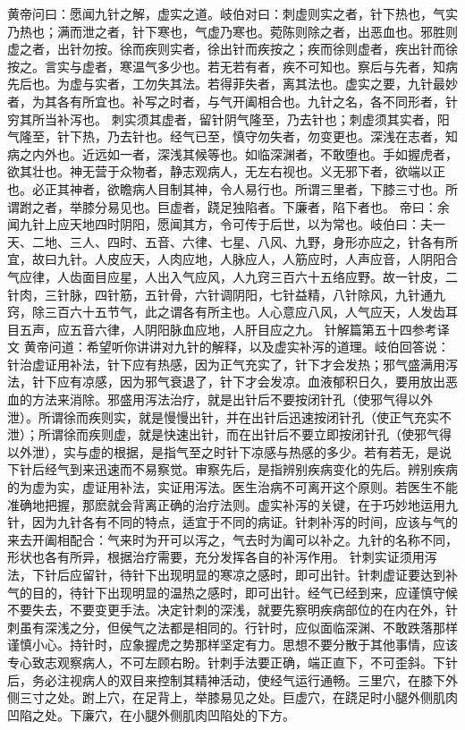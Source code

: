\documentclass[a4paper,12pt,UTF8,twoside]{ctexbook}
\begin{document}
黄帝问曰：愿闻九针之解，虚实之道。岐伯对曰：刺虚则实之者，针下热也，气实乃热也；满而泄之者，针下寒也，气虚乃寒也。菀陈则除之者，出恶血也。邪胜则虚之者，出针勿按。徐而疾则实者，徐出针而疾按之；疾而徐则虚者，疾出针而徐按之。言实与虚者，寒温气多少也。若无若有者，疾不可知也。察后与先者，知病先后也。为虚与实者，工勿失其法。若得菲失者，离其法也。虚实之要，九针最妙者，为其各有所宜也。补写之时者，与气开阖相合也。九针之名，各不同形者，针穷其所当补泻也。
刺实须其虚者，留针阴气隆至，乃去针也；刺虚须其实者，阳气隆至，针下热，乃去针也。经气已至，慎守勿失者，勿变更也。深浅在志者，知病之内外也。近远如一者，深浅其候等也。如临深渊者，不敢堕也。手如握虎者，欲其壮也。神无营于众物者，静志观病人，无左右视也。义无邪下者，欲端以正也。必正其神者，欲瞻病人目制其神，令人易行也。所谓三里者，下膝三寸也。所谓跗之者，举膝分易见也。巨虚者，跷足独陷者。下廉者，陷下者也。
帝曰：余闻九针上应天地四时阴阳，愿闻其方，令可传于后世，以为常也。岐伯曰：夫一天、二地、三人、四时、五音、六律、七星、八风、九野，身形亦应之，针各有所宜，故曰九针。人皮应天，人肉应地，人脉应人，人筋应时，人声应音，人阴阳合气应律，人齿面目应星，人出入气应风，人九窍三百六十五络应野。故一针皮，二针肉，三针脉，四针筋，五针骨，六针调阴阳，七针益精，八针除风，九针通九窍，除三百六十五节气，此之谓各有所主也。人心意应八风，人气应天，人发齿耳目五声，应五音六律，人阴阳脉血应地，人肝目应之九。
针解篇第五十四参考译文
黄帝问道：希望听你讲讲对九针的解释，以及虚实补泻的道理。岐伯回答说：针治虚证用补法，针下应有热感，因为正气充实了，针下才会发热；邪气盛满用泻法，针下应有凉感，因为邪气衰退了，针下才会发凉。血液郁积日久，要用放出恶血的方法来消除。邪盛用泻法治疗，就是出针后不要按闭针孔（使邪气得以外泄）。所谓徐而疾则实，就是慢慢出针，并在出针后迅速按闭针孔（使正气充实不泄）；所谓徐而疾则虚，就是快速出针，而在出针后不要立即按闭针孔（使邪气得以外泄），实与虚的根据，是指气至之时针下凉感与热感的多少。若有若无，是说下针后经气到来迅速而不易察觉。审察先后，是指辨别疾病变化的先后。辨别疾病的为虚为实，虚证用补法，实证用泻法。医生治病不可离开这个原则。若医生不能准确地把握，那麽就会背离正确的治疗法则。虚实补泻的关键，在于巧妙地运用九针，因为九针各有不同的特点，适宜于不同的病证。针刺补泻的时间，应该与气的来去开阖相配合：气来时为开可以泻之，气去时为阖可以补之。九针的名称不同，形状也各有所异，根据治疗需要，充分发挥各自的补泻作用。
针刺实证须用泻法，下针后应留针，待针下出现明显的寒凉之感时，即可出针。针刺虚证要达到补气的目的，待针下出现明显的温热之感时，即可出针。经气已经到来，应谨慎守候不要失去，不要变更手法。决定针刺的深浅，就要先察明疾病部位的在内在外，针刺虽有深浅之分，但侯气之法都是相同的。行针时，应似面临深渊、不敢跌落那样谨慎小心。持针时，应象握虎之势那样坚定有力。思想不要分散于其他事情，应该专心致志观察病人，不可左顾右盼。针刺手法要正确，端正直下，不可歪斜。下针后，务必注视病人的双目来控制其精神活动，使经气运行通畅。三里穴，在膝下外侧三寸之处。跗上穴，在足背上，举膝易见之处。巨虚穴，在跷足时小腿外侧肌肉凹陷之处。下廉穴，在小腿外侧肌肉凹陷处的下方。
\end{document}
